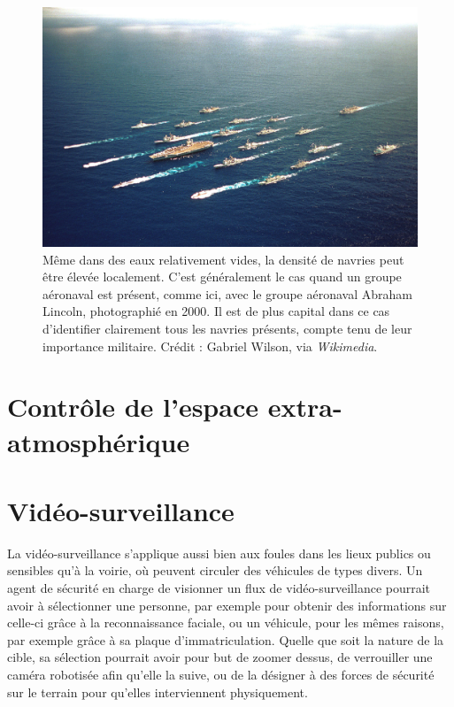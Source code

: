 	\begin{figure}[htb]
		\centering
		\includegraphics[width=\textwidth]{figures/ch1/lincoln}
		\caption{Même dans des eaux relativement vides, la densité de navries peut être élevée localement. C'est généralement le cas quand un groupe aéronaval est présent, comme ici, avec le groupe aéronaval Abraham Lincoln, photographié en 2000. Il est de plus capital dans ce cas d'identifier clairement tous les navries présents, compte tenu de leur importance militaire. Crédit : Gabriel Wilson, via \emph{Wikimedia}.}
		\label{fig:lincoln}
	\end{figure}
	
	\section{Contrôle de l'espace extra-atmosphérique}
	
	\section{Vidéo-surveillance}
	La vidéo-surveillance s'applique aussi bien aux foules dans les lieux publics ou sensibles qu'à la voirie, où peuvent circuler des véhicules de types divers. Un agent de sécurité en charge de visionner un flux de vidéo-surveillance pourrait avoir à sélectionner une personne, par exemple pour obtenir des informations sur celle-ci grâce à la reconnaissance faciale, ou un véhicule, pour les mêmes raisons, par exemple grâce à sa plaque d'immatriculation. Quelle que soit la nature de la cible, sa sélection pourrait avoir pour but de zoomer dessus, de verrouiller une caméra robotisée afin qu'elle la suive, ou de la désigner à des forces de sécurité sur le terrain pour qu'elles interviennent physiquement.
	
